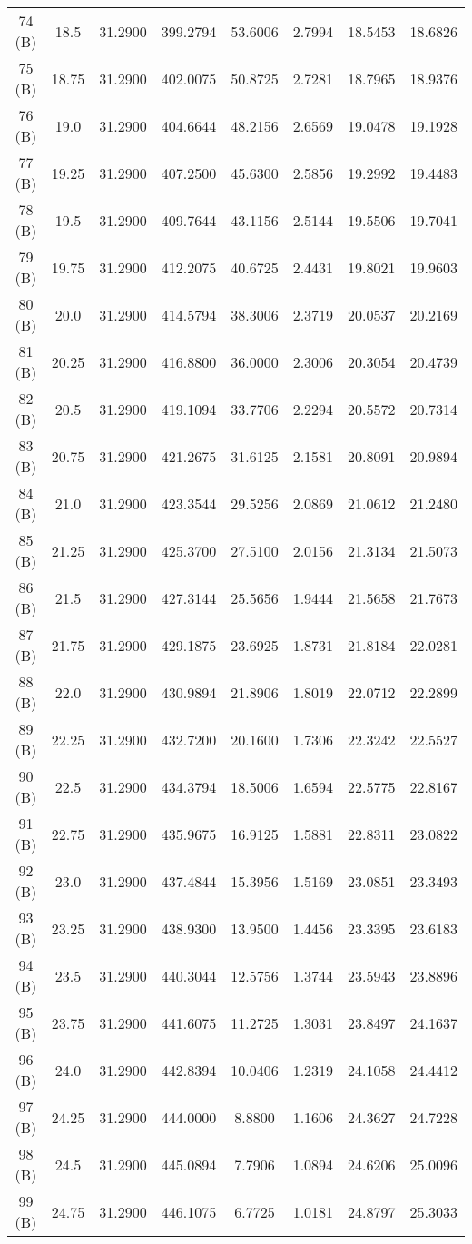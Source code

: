 \begin{landscape}
{\begin{longtable}{c|c|c|c|c|c|c|c}
74 (B)&18.5&31.2900&399.2794&53.6006&2.7994&18.5453&18.6826 \\
75 (B)&18.75&31.2900&402.0075&50.8725&2.7281&18.7965&18.9376 \\
76 (B)&19.0&31.2900&404.6644&48.2156&2.6569&19.0478&19.1928 \\
77 (B)&19.25&31.2900&407.2500&45.6300&2.5856&19.2992&19.4483 \\
78 (B)&19.5&31.2900&409.7644&43.1156&2.5144&19.5506&19.7041 \\
79 (B)&19.75&31.2900&412.2075&40.6725&2.4431&19.8021&19.9603 \\
80 (B)&20.0&31.2900&414.5794&38.3006&2.3719&20.0537&20.2169 \\
81 (B)&20.25&31.2900&416.8800&36.0000&2.3006&20.3054&20.4739 \\
82 (B)&20.5&31.2900&419.1094&33.7706&2.2294&20.5572&20.7314 \\
83 (B)&20.75&31.2900&421.2675&31.6125&2.1581&20.8091&20.9894 \\
84 (B)&21.0&31.2900&423.3544&29.5256&2.0869&21.0612&21.2480 \\
85 (B)&21.25&31.2900&425.3700&27.5100&2.0156&21.3134&21.5073 \\
86 (B)&21.5&31.2900&427.3144&25.5656&1.9444&21.5658&21.7673 \\
87 (B)&21.75&31.2900&429.1875&23.6925&1.8731&21.8184&22.0281 \\
88 (B)&22.0&31.2900&430.9894&21.8906&1.8019&22.0712&22.2899 \\
89 (B)&22.25&31.2900&432.7200&20.1600&1.7306&22.3242&22.5527 \\
90 (B)&22.5&31.2900&434.3794&18.5006&1.6594&22.5775&22.8167 \\
91 (B)&22.75&31.2900&435.9675&16.9125&1.5881&22.8311&23.0822 \\
92 (B)&23.0&31.2900&437.4844&15.3956&1.5169&23.0851&23.3493 \\
93 (B)&23.25&31.2900&438.9300&13.9500&1.4456&23.3395&23.6183 \\
94 (B)&23.5&31.2900&440.3044&12.5756&1.3744&23.5943&23.8896 \\
95 (B)&23.75&31.2900&441.6075&11.2725&1.3031&23.8497&24.1637 \\
96 (B)&24.0&31.2900&442.8394&10.0406&1.2319&24.1058&24.4412 \\
97 (B)&24.25&31.2900&444.0000&8.8800&1.1606&24.3627&24.7228 \\
98 (B)&24.5&31.2900&445.0894&7.7906&1.0894&24.6206&25.0096 \\
99 (B)&24.75&31.2900&446.1075&6.7725&1.0181&24.8797&25.3033 \\

\end{longtable}}
\end{landscape}
